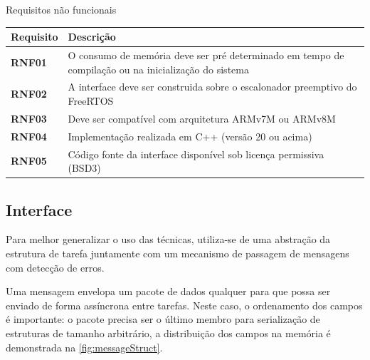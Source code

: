 \begin{quadro}[H]
    \centering
    \caption{Requisitos não funcionais}
    \begin{tabular}{|p{}|p{}|}
        \hline
        \rowcolor[HTML]{C0C0C0}
        \textbf{Requisito} & \textbf{Descrição}  \\
        \hline
        
        \textbf{RNF01} & O consumo de memória deve ser pré determinado em tempo de compilação ou na inicialização do sistema \\
        \hline
        
        \textbf{RNF02} & A interface deve ser construida sobre o escalonador preemptivo do FreeRTOS \\
        \hline

        \textbf{RNF03} & Deve ser compatível com arquitetura ARMv7M ou ARMv8M \\
        \hline

        \textbf{RNF04} & Implementação realizada em C++ (versão 20 ou acima) \\
        \hline
        
        \textbf{RNF05} & Código fonte da interface disponível sob licença permissiva (BSD3) \\
        \hline
    \end{tabular}
    \label{tab:rnf}
\end{quadro}

\subsection{Interface} \label{subsec:interface}

Para melhor generalizar o uso das técnicas, utiliza-se de uma abstração da estrutura de tarefa juntamente com um mecanismo de passagem de mensagens com detecção de erros.

Uma mensagem envelopa um pacote de dados qualquer para que possa ser enviado de forma assíncrona entre tarefas. Neste caso, o ordenamento dos campos é importante: o pacote precisa ser o último membro para serialização de estruturas de tamanho arbitrário, a distribuição dos campos na memória é demonstrada na \autoref{fig:messageStruct}. 

